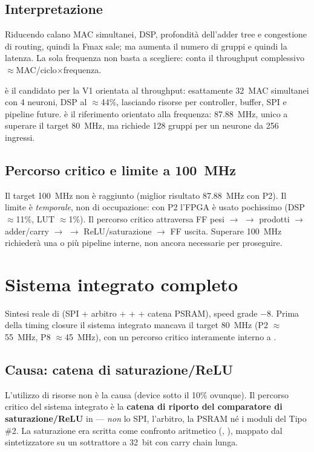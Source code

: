\subsection{Interpretazione}
Riducendo  calano MAC simultanei, DSP, profondità dell'adder tree e
congestione di routing, quindi la Fmax sale; ma aumenta il numero di gruppi e quindi la
latenza. La sola frequenza non basta a scegliere: conta il throughput complessivo
$\approx$MAC/ciclo$\times$frequenza.

\begin{fnnote}
 è il candidato per la V1 orientata al throughput: esattamente 32~MAC
simultanei con 4 neuroni, DSP al $\approx$44\%, lasciando risorse per controller,
buffer, SPI e pipeline future.  è il riferimento orientato alla
frequenza: 87.88~MHz, unico a superare il target 80~MHz, ma richiede 128 gruppi per un
neurone da 256 ingressi.
\end{fnnote}

\subsection{Percorso critico e limite a 100~MHz}
Il target 100~MHz non è raggiunto (miglior risultato 87.88~MHz con P2). Il limite è
\emph{temporale}, non di occupazione: con P2 l'FPGA è usato pochissimo (DSP $\approx$11\%,
LUT $\approx$1\%). Il percorso critico attraversa FF pesi $\to$  $\to$
prodotti $\to$ adder/carry $\to$  $\to$ ReLU/saturazione $\to$ FF uscita.
Superare 100~MHz richiederà una o più pipeline interne, non ancora necessarie per
proseguire.

\section{Sistema integrato completo}
Sintesi reale di  (SPI + arbitro +  +
 + catena PSRAM), speed grade $-8$. Prima della timing closure il
sistema integrato mancava il target 80~MHz (P2 $\approx$55~MHz, P8 $\approx$45~MHz), con
un percorso critico interamente interno a .

\subsection{Causa: catena di saturazione/ReLU}
L'utilizzo di risorse non è la causa (device sotto il 10\% ovunque). Il percorso critico
del sistema integrato è la \textbf{catena di riporto  del comparatore di
saturazione/ReLU} in  --- \emph{non} lo SPI, l'arbitro, la PSRAM
né i moduli del Tipo \#2. La saturazione era scritta come confronto aritmetico
(, ), mappato dal sintetizzatore su un sottrattore a
32~bit con carry chain lunga.

